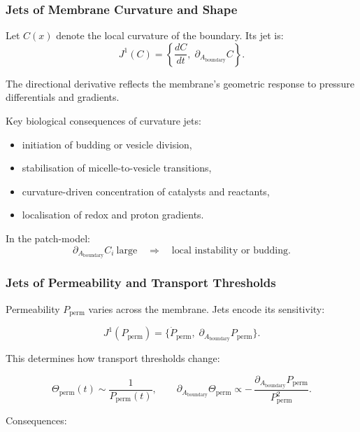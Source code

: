 \subsubsection{Jets of Membrane Curvature and Shape}

Let $C(x)$ denote the local curvature of the boundary. Its jet is:
\[
J^1(C)=
\left\{
\frac{dC}{dt},\;
\partial_{A_{\mathrm{boundary}}}C
\right\}.
\]

The directional derivative reflects the membrane's geometric response to
pressure differentials and gradients.

Key biological consequences of curvature jets:

\begin{itemize}
    \item initiation of budding or vesicle division,
    \item stabilisation of micelle-to-vesicle transitions,
    \item curvature-driven concentration of catalysts and reactants,
    \item localisation of redox and proton gradients.
\end{itemize}

In the patch-model:
\[
\partial_{A_{\mathrm{boundary}}}C_i
\ \text{large}
\quad\Rightarrow\quad
\text{local instability or budding}.
\]


\subsubsection{Jets of Permeability and Transport Thresholds}

Permeability $P_{\mathrm{perm}}$ varies across the membrane. Jets encode
its sensitivity:

\[
J^1(P_{\mathrm{perm}})=
\bigl\{
\dot{P}_{\mathrm{perm}},\;
\partial_{A_{\mathrm{boundary}}}P_{\mathrm{perm}}
\bigr\}.
\]

This determines how transport thresholds change:

\[
\Theta_{\mathrm{perm}}(t)
\sim 
\frac{1}{P_{\mathrm{perm}}(t)},
\qquad
\partial_{A_{\mathrm{boundary}}}\Theta_{\mathrm{perm}}
\propto
-\,\frac{\partial_{A_{\mathrm{boundary}}}P_{\mathrm{perm}}}{P_{\mathrm{perm}}^2}.
\]

Consequences:


